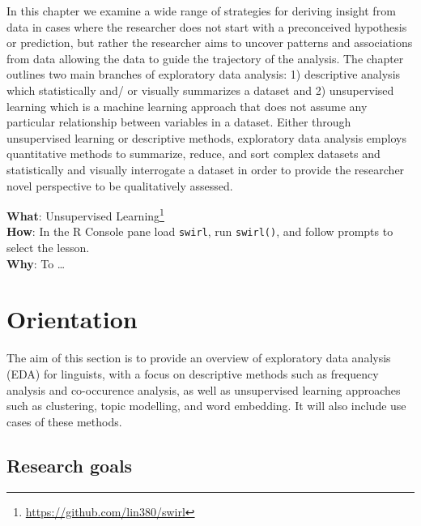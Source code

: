 \documentclass[
  letterpaper,
]{scrbook}
\DeclareRobustCommand{\href}[2]{#2\footnote{\url{#1}}}
\begin{document}
In this chapter we examine a wide range of strategies for deriving
insight from data in cases where the researcher does not start with a
preconceived hypothesis or prediction, but rather the researcher aims to
uncover patterns and associations from data allowing the data to guide
the trajectory of the analysis. The chapter outlines two main branches
of exploratory data analysis: 1) descriptive analysis which
statistically and/ or visually summarizes a dataset and 2) unsupervised
learning which is a machine learning approach that does not assume any
particular relationship between variables in a dataset. Either through
unsupervised learning or descriptive methods, exploratory data analysis
employs quantitative methods to summarize, reduce, and sort complex
datasets and statistically and visually interrogate a dataset in order
to provide the researcher novel perspective to be qualitatively
assessed.

\begin{tcolorbox}[enhanced jigsaw, title=\textcolor{quarto-callout-tip-color}{\faLightbulb}\hspace{0.5em}{Swirl}, breakable, colback=white, colframe=quarto-callout-tip-color-frame, bottomrule=.15mm, left=2mm, bottomtitle=1mm, colbacktitle=quarto-callout-tip-color!10!white, opacityback=0, arc=.35mm, toprule=.15mm, coltitle=black, leftrule=.75mm, opacitybacktitle=0.6, toptitle=1mm, titlerule=0mm, rightrule=.15mm]

\textbf{What}: \href{https://github.com/lin380/swirl}{Unsupervised
Learning}\\
\textbf{How}: In the R Console pane load \texttt{swirl}, run
\texttt{swirl()}, and follow prompts to select the lesson.\\
\textbf{Why}: To \ldots{}

\end{tcolorbox}

\hypertarget{eda-orientation}{%
\section{Orientation}\label{eda-orientation}}

The aim of this section is to provide an overview of exploratory data
analysis (EDA) for linguists, with a focus on descriptive methods such
as frequency analysis and co-occurence analysis, as well as unsupervised
learning approaches such as clustering, topic modelling, and word
embedding. It will also include use cases of these methods.

\hypertarget{eda-research-goals}{%
\subsection{Research goals}\label{eda-research-goals}}
\end{document}
